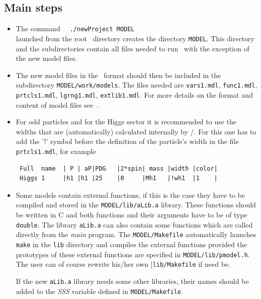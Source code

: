 \documentclass[12pt,a4paper]{article}
\begin{document}
\subsection{Main steps}
\begin{itemize}
\item
The command
\verb|  ./newProject |{\tt MODEL}\\
launched from the root \micro\ directory  creates the directory 
\verb|MODEL|. This directory and the subdirectories contain all files needed to run \micro\ with the
exception of the new model files. 

\item
The new model files in the \calchep\ format should then be included in the
 subdirectory {\tt MODEL}\verb|/work/models|.  The files needed are
\verb|vars1.mdl|,  \verb|func1.mdl|,  \verb|prtcls1.mdl|, \verb|lgrng1.mdl|,
\verb|extlib1.mdl|. For more details on the format and content of model files see~\cite{Pukhov:2004ca}.

\item
For odd particles and for the Higgs sector it is recommended to use the widths that are (automatically) calculated internally by 
\calchep/\micro. 
For this  one has to add the '!' symbol before  
the definition of the particle's width  in  the file \verb|prtcls1.mdl|, for example
\begin{verbatim}
 Full  name  | P | aP|PDG   |2*spin| mass |width |color|  
 Higgs 1     |h1 |h1 |25    |0     |Mh1   |!wh1  |1    |
\end{verbatim}


\item
Some models contain  external functions, if this is the case  they have to be 
compiled and stored in the {\tt MODEL}\verb|/lib/aLib.a| library. 
These functions should be written in C and both functions and their arguments have to be 
of type \verb|double|. The library \verb|aLib.a| 
can also contain some functions which are called directly from the 
{\it main} program. The {\tt MODEL}\verb|/Makefile| automatically launches
\verb|make| in the \verb|lib| directory and compiles the external functions provided
the prototypes of these external 
functions are specified in  {\tt MODEL}\verb|/lib/pmodel.h|. 
The user can of course rewrite 
his/her own  |\verb|lib/Makefile| if need be.

If the new \verb|aLib.a| library needs some other libraries, their
names should be added to the {\it SSS} variable defined in {\tt MODEL}\verb|/Makefile|.
\end{itemize}
\end{document}
